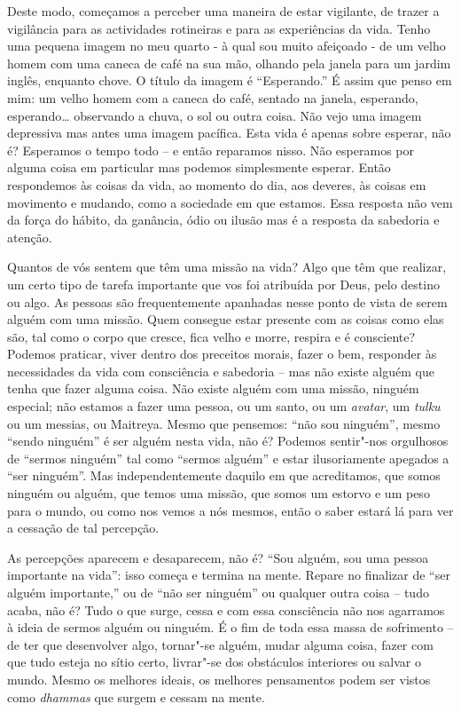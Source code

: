 Deste modo, começamos a perceber uma maneira de estar vigilante, de
trazer a vigilância para as actividades rotineiras e para as
experiências da vida. Tenho uma pequena imagem no meu quarto - à qual
sou muito afeiçoado - de um velho homem com uma caneca de café na sua
mão, olhando pela janela para um jardim inglês, enquanto chove. O título
da imagem é ``Esperando.'' É assim que penso em mim: um velho homem com
a caneca do café, sentado na janela, esperando, esperando\ldots{} observando
a chuva, o sol ou outra coisa. Não vejo uma imagem depressiva mas antes
uma imagem pacífica. Esta vida é apenas sobre esperar, não é? Esperamos
o tempo todo -- e então reparamos nisso. Não esperamos por alguma coisa
em particular  mas podemos simplesmente esperar. Então respondemos às
coisas da vida, ao momento do dia, aos deveres, às coisas em movimento e
mudando, como a sociedade em que estamos. Essa resposta não vem da força
do hábito, da ganância, ódio ou ilusão mas é a resposta da sabedoria e
atenção.

Quantos de vós sentem que têm uma missão na vida? Algo que têm que
realizar, um certo tipo de tarefa importante que vos foi atribuída por
Deus, pelo destino ou algo. As pessoas são frequentemente apanhadas
nesse ponto de vista de serem alguém com uma missão. Quem consegue estar
presente com as coisas como elas são, tal como o corpo que cresce, fica
velho e morre, respira e é consciente? Podemos praticar, viver dentro
dos preceitos morais, fazer o bem, responder às necessidades da vida com
consciência e sabedoria -- mas não existe alguém que tenha que fazer
alguma coisa. Não existe alguém com uma missão, ninguém especial; não
estamos a fazer uma pessoa, ou um santo, ou um \emph{avatar}, um
\emph{tulku} ou um messias, ou Maitreya. Mesmo que pensemos: ``não sou
ninguém'', mesmo ``sendo ninguém'' é ser alguém nesta vida, não é?
Podemos sentir"-nos orgulhosos de ``sermos ninguém'' tal como ``sermos
alguém'' e estar ilusoriamente apegados a ``ser ninguém''. Mas
independentemente daquilo em que acreditamos, que somos ninguém ou
alguém, que temos uma missão, que somos um estorvo e um peso para o
mundo, ou como nos vemos a nós mesmos, então o saber estará lá para ver
a cessação de tal percepção.

As percepções aparecem e desaparecem, não é? ``Sou alguém, sou uma
pessoa importante na vida'': isso começa e termina na mente. Repare no
finalizar de ``ser alguém importante,'' ou de ``não ser ninguém'' ou
qualquer outra coisa -- tudo acaba, não é? Tudo o que surge, cessa e com
essa consciência não nos agarramos à ideia de sermos alguém ou ninguém.
É o fim de toda essa massa de sofrimento -- de ter que desenvolver algo,
tornar"-se alguém, mudar alguma coisa, fazer com que tudo esteja no sítio
certo, livrar"-se dos obstáculos interiores ou salvar o mundo. Mesmo os
melhores ideais, os melhores pensamentos podem ser vistos como
\emph{dhammas} que surgem e cessam na mente.

